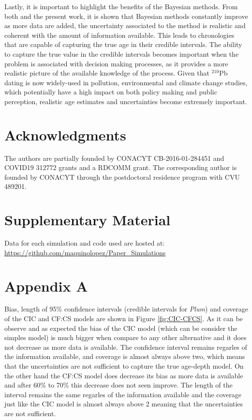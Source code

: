 \documentclass [10pt] {article}
\begin{document}
Lastly, it is important to highlight the benefits of the Bayesian methods.
From both \citet{Blaauw2018} and the present work, it is shown that Bayesian methods constantly improve as more data are added, the uncertainty associated to the method is realistic and coherent with the amount of information available. This leads to chronologies that are capable of capturing the true age in their credible intervals. 
The ability to capture the true value in the credible intervals becomes important when the problem is associated with decision making processes, as it provides a more realistic picture of the available knowledge of the process. 
Given that $^{210}$Pb dating is now widely-used in pollution, environmental and climate change studies, which potentially have a high impact on both policy making and public perception, realistic age estimates and uncertainties become extremely important. 



\section{Acknowledgments}

The authors are partially founded by CONACYT CB-2016-01-284451 and COVID19 312772 grants and a RDCOMM grant.
The corresponding author is founded by CONACYT through the postdoctoral residence program with CVU  489201.




\newpage




\section{Supplementary Material}
\label{sec:supp_mat}
Data for each simulation and code used are hosted at: \url{https://github.com/maquinolopez/Paper_Simulations}

\section{Appendix A}

Bias, length of 95\% confidence intervals (credible intervals for \textit{Plum}) and coverage of the CIC and CF:CS models are shown in Figure \ref{fig:CIC-CFCS}.
As it can be observe and as expected the bias of the CIC model (which can be consider the simples model) is much bigger when compare to any other alternative and it does not decrease as more data is available.
The confidence interval remains regarles of the information available, and coverage is almost always above two, which means that the uncertainties are not sufficient to capture the true age-depth model.
On the other hand the CF:CS model does decrease its bias as more data is available and after 60\% to 70\% this decrease does not seen improve.
The length of the interval remains the same regarles of the information available and the coverage just like the CIC model is almost always above 2 meaning that the uncertainties are not sufficient.
\end{document}
